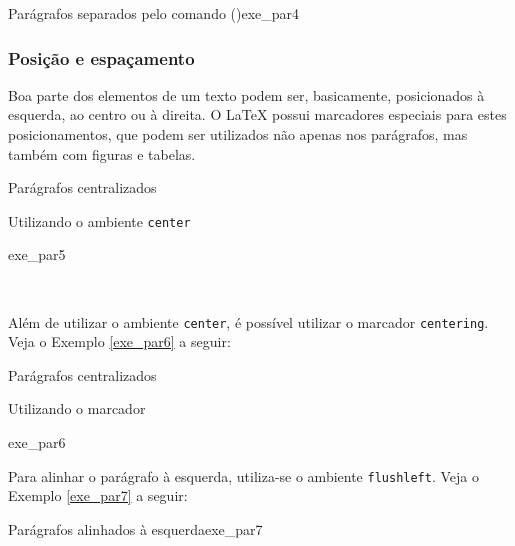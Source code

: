 \begin{texexptitled}[breakable,enhanced,middle=2mm]{Parágrafos separados pelo comando (\texttt{\newline})}{exe_par4}
\lipsumsentence[1-4]
\newline
\lipsumsentence[5-8]
\end{texexptitled}

\subsubsection*{Posição e espaçamento}
\label{sec:pos_espac}

Boa parte dos elementos de um texto podem ser, basicamente, posicionados à esquerda, ao centro ou à direita. O \LaTeX{} possui marcadores especiais para estes posicionamentos, que podem ser utilizados não apenas nos parágrafos, mas também com figuras e tabelas.

\begin{texexptitled}[breakable,enhanced,middle=2mm]{Parágrafos centralizados \par Utilizando o ambiente \texttt{center}}{exe_par5}
\begin{center}
\lipsumsentence[9-10] \\ 
\lipsumsentence[11-12]
\end{center}
\end{texexptitled}

Além de utilizar o ambiente \texttt{center}, é possível utilizar o marcador \texttt{centering}. Veja o Exemplo \ref{exe_par6} a seguir: 

\begin{texexptitled}[breakable,enhanced,middle=2mm]{Parágrafos centralizados \par Utilizando o marcador \texttt{\centering}}{exe_par6}
\centering
\lipsumsentence[13-14] \\ 
\lipsumsentence[15-16]
\end{texexptitled}

Para alinhar o parágrafo à esquerda, utiliza-se o ambiente {\tt flushleft}. Veja o Exemplo \ref{exe_par7} a seguir:

\begin{texexptitled}[breakable,enhanced,middle=2mm]{Parágrafos alinhados à esquerda}{exe_par7}
\begin{flushleft}
\lipsumsentence[17-18] \\ 
\lipsumsentence[19-20]
\end{flushleft}
\end{texexptitled}

